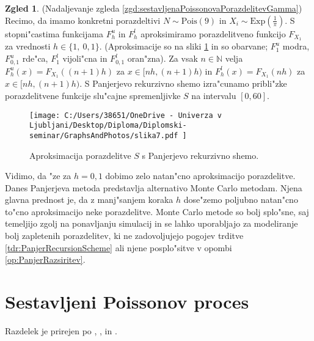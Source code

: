 \documentclass[12pt, a4paper, reqno]{amsart}
\theoremstyle{definition}
\newtheorem{zgled}[definicija]{Zgled}
\theoremstyle{plain}
\newcommand{\N}{\mathbb{N}}
\newcommand{\1}{\mathds{1}}
\newcommand{\Pois}[1]{\text{Pois}(#1)}
\begin{document}
    \begin{zgled}(Nadaljevanje zgleda \ref{zgd:sestavljenaPoissonovaPorazdelitevGamma}) Recimo, da imamo
        konkretni porazdeltivi $N\sim\Pois{9}$ in $X_i\sim\text{Exp}(\frac{1}{\pi})$. S stopni"castima funkcijama
        $F^u_h$ in $F_h^l$ aproksimiramo porazdelitveno funkcijo $F_{X_1}$ za vrednosti $h \in \{1, \ 0{,}1\}$. 
        (Aproksimacije so na sliki \ref{fig:slika7} in so obarvane;  $F^u_{1}$ modra, $F^u_{0{,}1}$ 
        rde"ca, $F^l_{1}$ vijoli"cna in $F^l_{0{,}1}$ oran"zna).
        Za vsak $n\in\N$ velja $F^u_h(x) = F_{X_1}((n+1)h)$ za $x\in\bigl[nh, (n+1)h\bigr)$ in 
        $F^l_h(x) = F_{X_1}(nh)$ za $x\in\bigl[nh, (n+1)h\bigr)$.
        S Panjerjevo rekurzivno shemo izra"cunamo pribli"zke porazdelitvene funkcije slu"cajne 
        spremenljivke $S$ na intervalu $[0, 60]$.  
 
        \begin{figure}[h!]
            \begin{center}
                \texttt{[image: 
                    C:/Users/38651/OneDrive - Univerza v Ljubljani/Desktop/Diploma/Diplomski-seminar/GraphsAndPhotos/slika7.pdf
                ]}
                \caption{Aproksimacija porazdelitve $S$ s Panjerjevo rekurzivno shemo.}
                \label{fig:slika7}
            \end{center}
        \end{figure}
        
    \pagebreak
    Vidimo, da "ze za $h = 0{,}1$ dobimo zelo natan"cno aproksimacijo porazdelitve. Danes 
    Panjerjeva metoda predstavlja alternativo Monte Carlo metodam. Njena glavna prednost 
    je, da z manj"sanjem koraka $h$ dose"zemo poljubno natan"cno to"cno aproksimacijo neke porazdelitve. 
    Monte Carlo metode so bolj splo"sne, saj temeljijo zgolj na ponavljanju simulacij in se lahko uporabljajo za modeliranje bolj zapletenih 
    porazdelitev, ki ne zadovoljujejo pogojev trditve \ref{tdr:PanjerRecursionScheme} ali njene posplo"sitve
    v opombi \ref{op:PanjerRazsiritev}.

    \label{zgd:PanjerExp}  
    \end{zgled}


\section{Sestavljeni Poissonov proces}

    \noindent
    Razdelek je prirejen po \cite{1}, \cite{2}, in \cite{3}.
\end{document}
